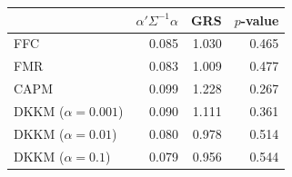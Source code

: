 \begin{tabular}{lrrr}
\toprule
 & $\alpha'\Sigma^{-1}\alpha$ & GRS & $p$-value \\
\midrule
FFC & 0.085 & 1.030 & 0.465 \\
FMR & 0.083 & 1.009 & 0.477 \\
CAPM & 0.099 & 1.228 & 0.267 \\
DKKM ($\alpha=0.001$) & 0.090 & 1.111 & 0.361 \\
DKKM ($\alpha=0.01$) & 0.080 & 0.978 & 0.514 \\
DKKM ($\alpha=0.1$) & 0.079 & 0.956 & 0.544 \\
\bottomrule
\end{tabular}
